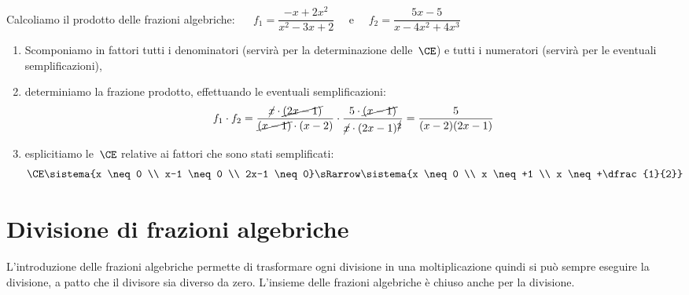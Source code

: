  \begin{esempio}
Calcoliamo il prodotto delle frazioni algebriche: ~~
\(f_{1}=\dfrac{-x+2x^2}{x^2-3x+2}\) ~~e~~ \(f_{2}=\dfrac{5x-5}{x-4x^2+4x^3}\)

\begin{enumerate}
 \item Scomponiamo in fattori tutti i denominatori (servirà per la 
 determinazione delle~\(\CE\)) e
    tutti i numeratori (servirà per le eventuali semplificazioni),
 \item determiniamo la frazione prodotto, effettuando le eventuali 
  semplificazioni:
\[f_1 \cdot f_2 = 
\dfrac{\cancel{x} \cdot \cancel{(2x-1)}}{\cancel{(x-1)} \cdot {(x-2)}} \cdot 
\dfrac{5\cdot\cancel{(x-1)}}{\cancel{x}\cdot(2x-1)^{\cancel{2}}}=
\dfrac{5}{(x-2)(2x-1)}\]
 \item esplicitiamo le~\(\CE\) relative ai fattori che sono stati semplificati:
\[\CE \sistema{x \neq 0 \\
      x-1 \neq 0 \\
      2x-1 \neq 0}
\sRarrow
\sistema{x \neq 0 \\
         x \neq +1 \\
         x \neq +\dfrac{1}{2}}
      \]

\end{enumerate}
\end{esempio}


\section{Divisione di frazioni algebriche}
\label{sec:frazalg_divisione}

L'introduzione delle frazioni algebriche permette di trasformare ogni 
divisione in una moltiplicazione quindi si può sempre eseguire la divisione, 
a patto che il divisore sia diverso da zero.
L'insieme delle frazioni algebriche è chiuso anche per la divisione.

